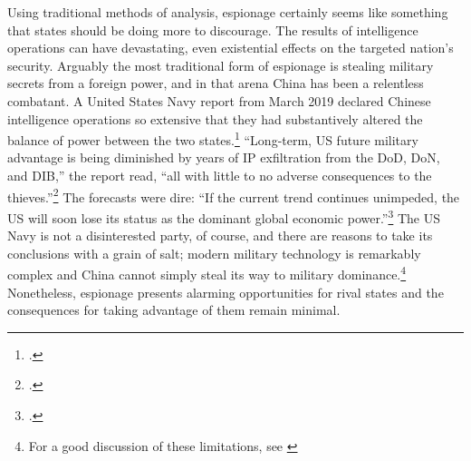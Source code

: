 \documentclass[14pt]{extarticle}
\begin{document}




Using traditional methods of analysis, espionage certainly seems like something that states should be doing more to discourage. The results of intelligence operations can have devastating, even existential effects on the targeted nation's security. Arguably the most traditional form of espionage is stealing military secrets from a foreign power, and in that arena China has been a relentless combatant. A United States Navy report from March 2019 declared Chinese intelligence operations so extensive that they had substantively altered the balance of power between the two states.\footcite{lubold_navy_2019} \enquote{Long-term, US future military advantage is being diminished by years of IP exfiltration from the DoD, DoN, and DIB,} the report read, \enquote{all with little to no adverse consequences to the thieves.}\footcite[p.~6]{bayer_cybersecurity_2019} The forecasts were dire: \enquote{If the current trend continues unimpeded, the US will soon lose its status as the dominant global economic power.}\footcite[p.~5]{bayer_cybersecurity_2019} The US Navy is not a disinterested party, of course, and there are reasons to take its conclusions with a grain of salt; modern military technology is remarkably complex and China cannot simply steal its way to military dominance.\footnote{For a good discussion of these limitations, see \cite{gilli_why_2019}} Nonetheless, espionage presents alarming opportunities for rival states and the consequences for taking advantage of them remain minimal.
\end{document}
